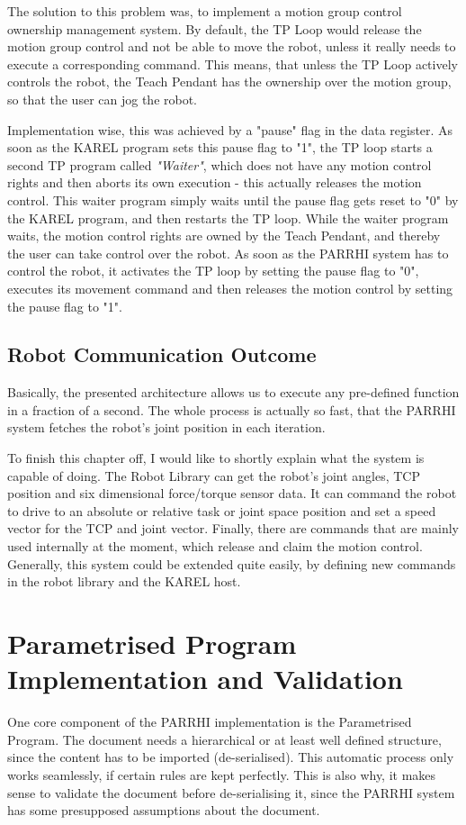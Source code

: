 The solution to this problem was, to implement a motion group control ownership management system. By default, the TP Loop would release the motion group control and not be able to move the robot, unless it really needs to execute a corresponding command. This means, that unless the TP Loop actively controls the robot, the Teach Pendant has the ownership over the motion group, so that the user can jog the robot.

Implementation wise, this was achieved by a "pause" flag in the data register. As soon as the KAREL program sets this pause flag to "1", the TP loop starts a second TP program called \textit{"Waiter"}, which does not have any motion control rights and then aborts its own execution - this actually releases the motion control. This waiter program simply waits until the pause flag gets reset to "0" by the KAREL program, and then restarts the TP loop. While the waiter program waits, the motion control rights are owned by the Teach Pendant, and thereby the user can take control over the robot. As soon as the PARRHI system has to control the robot, it activates the TP loop by setting the pause flag to "0", executes its movement command and then releases the motion control by setting the pause flag to "1".

\subsection{Robot Communication Outcome}

Basically, the presented architecture allows us to execute any pre-defined function in a fraction of a second. The whole process is actually so fast, that the PARRHI system fetches the robot's joint position in each iteration.

To finish this chapter off, I would like to shortly explain what the system is capable of doing. The Robot Library can get the robot's joint angles, TCP position and six dimensional force/torque sensor data. It can command the robot to drive to an absolute or relative task or joint space position and set a speed vector for the TCP and joint vector. Finally, there are commands that are mainly used internally at the moment, which release and claim the motion control. Generally, this system could be extended quite easily, by defining new commands in the robot library and the KAREL host.

\section{Parametrised Program Implementation and Validation}
One core component of the PARRHI implementation is the Parametrised Program. The document needs a hierarchical or at least well defined structure, since the content has to be imported (de-serialised). This automatic process only works seamlessly, if certain rules are kept perfectly. This is also why, it makes sense to validate the document before de-serialising it, since the PARRHI system has some presupposed assumptions about the document.  


